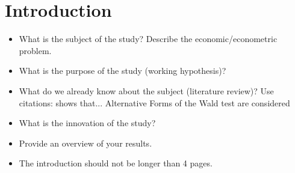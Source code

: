 \section{Introduction}

\begin{itemize}

    \item What is the subject of the study? Describe the
        economic/econometric problem.

    \item What is the purpose of the study (working hypothesis)?

    \item What do we already know about the subject (literature
        review)? Use citations: shows that...
        Alternative Forms of the Wald test are considered

    \item What is the innovation of the study?

    \item Provide an overview of your results.


    \item The introduction should not be longer than 4 pages.
    

\end{itemize}
